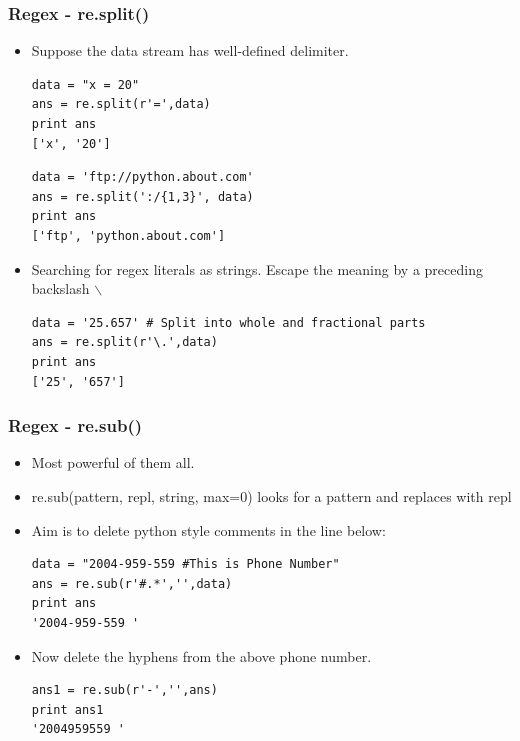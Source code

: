 \documentclass[xcolor=table,10pt]{beamer}
\begin{document}
\begin{frame}[fragile]
\frametitle{Regex -  re.split()}
\begin{itemize}
\item Suppose the data stream has well-defined delimiter.\\

\begin{verbatim}
data = "x = 20"
ans = re.split(r'=',data)
print ans
['x', '20']
\end{verbatim}
\vspace{1mm}
\begin{verbatim} 
data = 'ftp://python.about.com'
ans = re.split(':/{1,3}', data)
print ans
['ftp', 'python.about.com']
\end{verbatim}
\small
\item Searching for regex literals as strings. Escape the meaning by a preceding backslash $\backslash$

\begin{verbatim}
data = '25.657' # Split into whole and fractional parts
ans = re.split(r'\.',data)
print ans
['25', '657']
\end{verbatim}
\end{itemize}
\end{frame}

\begin{frame}[fragile]
\frametitle{Regex -  re.sub()}
\begin{itemize}
\item Most powerful of them all.
\item re.sub(pattern, repl, string, max=0) looks for a pattern and replaces with repl
\item Aim is to delete python style comments in the line below:\\

\begin{verbatim}
data = "2004-959-559 #This is Phone Number"
ans = re.sub(r'#.*','',data)
print ans
'2004-959-559 '
\end{verbatim}
\small
\item Now delete the hyphens from the above phone number.\\

\begin{verbatim}
ans1 = re.sub(r'-','',ans)
print ans1
'2004959559 '
\end{verbatim}
\end{itemize}
\end{frame}
\end{document}
